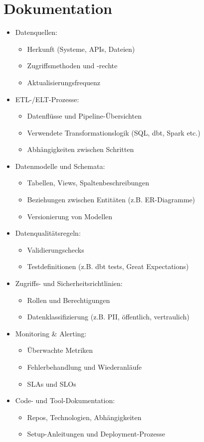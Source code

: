 \documentclass[11pt]{scrartcl}
\begin{document}
\newpage
\section{Dokumentation}
\begin{itemize}
	\item Datenquellen:
	\begin{itemize}
		\item Herkunft (Systeme, APIs, Dateien)
		\item Zugriffsmethoden und -rechte
		\item Aktualisierungsfrequenz
	\end{itemize}
	\item ETL-/ELT-Prozesse:
	\begin{itemize}
		\item Datenflüsse und Pipeline-Übersichten
		\item Verwendete Transformationslogik (SQL, dbt, Spark etc.)
		\item Abhängigkeiten zwischen Schritten
	\end{itemize}
	\item Datenmodelle und Schemata:
	\begin{itemize}
		\item Tabellen, Views, Spaltenbeschreibungen
		\item Beziehungen zwischen Entitäten (z.B. ER-Diagramme)
		\item Versionierung von Modellen
	\end{itemize}
	\item Datenqualitätsregeln:
	\begin{itemize}
		\item Validierungschecks
		\item Testdefinitionen (z.B. dbt tests, Great Expectations)
	\end{itemize}
	\item Zugriffs- und Sicherheitsrichtlinien:
	\begin{itemize}
		\item Rollen und Berechtigungen
		\item Datenklassifizierung (z.B. PII, öffentlich, vertraulich)
	\end{itemize}
	\item Monitoring \& Alerting:
	\begin{itemize}
		\item Überwachte Metriken
		\item Fehlerbehandlung und Wiederanläufe
		\item SLAs und SLOs
	\end{itemize}
	\item Code- und Tool-Dokumentation:
	\begin{itemize}
		\item Repos, Technologien, Abhängigkeiten
		\item Setup-Anleitungen und Deployment-Prozesse
	\end{itemize}
\end{itemize}
\end{document}
